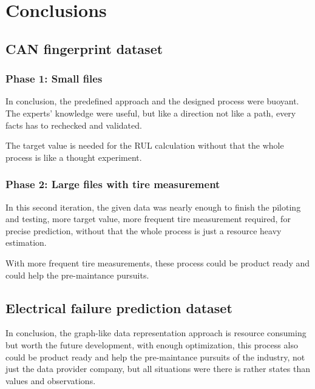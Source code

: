 \chapter{Conclusions}
\section{CAN fingerprint dataset}
\subsection{Phase 1: Small files}
In conclusion, the predefined approach and the designed process were buoyant. The experts' knowledge were useful, but like a direction not like a path, every facts has to rechecked and validated.

The target value is needed for the RUL calculation without that the whole process is like a thought experiment. 
\subsection{Phase 2: Large files with tire measurement}
In this second iteration, the given data was nearly enough to finish the piloting and testing, more target value, more frequent tire measurement required, for precise prediction, without that the whole process is just a resource heavy estimation.

With more frequent tire measurements, these process could be product ready and could help the pre-maintance pursuits.

\section{Electrical failure prediction dataset}

In conclusion, the graph-like data representation approach is resource consuming but worth the future development, with enough optimization, this process also could be product ready and help the pre-maintance pursuits of the industry, not just the data provider company, but all situations were there is rather states than values and observations.

